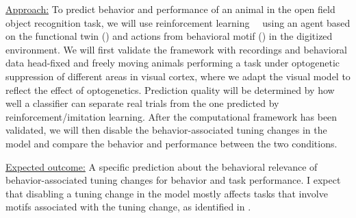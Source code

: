 \documentclass[COG,11pt]{ercgrant}
\begin{document}
\underline{Approach:} 
To predict behavior and performance of an animal in the open field object recognition task, we will use reinforcement learning~~\parencite{Cobbe2021-op} using an agent based on the functional twin () and actions from behavioral motif () in the digitized environment. 
We will first validate the framework with recordings and behavioral data head-fixed and freely moving animals performing a task under optogenetic suppression of different areas in visual cortex, where we adapt the visual model to reflect the effect of optogenetics. 
Prediction quality will be determined by how well a classifier can separate real trials from the one predicted by reinforcement/imitation learning. 
After the computational framework has been validated, we will then disable the behavior-associated tuning changes in the model and compare the behavior and performance between the two conditions.


\underline{Expected outcome:} 
A specific prediction about the behavioral relevance of behavior-associated tuning changes for behavior and task performance. %
I expect that disabling a tuning change in the model mostly affects tasks that involve motifs associated with the tuning change, as identified in .
\end{document}

